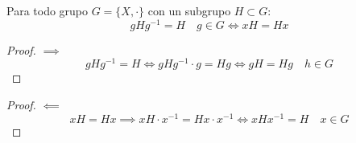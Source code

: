 \begin{thm}
    Para todo grupo $G = \{X, \cdot\}$ con un subgrupo $H \subset G$:
    \begin{equation}
        gHg^{-1} = H \quad g \in G \iff xH = Hx
    \end{equation}

    \begin{proof}
        $\implies$
        \begin{equation}
            gHg^{-1} = H \iff gHg^{-1}\cdot g = Hg \iff gH = Hg \quad h \in G   
        \end{equation}
    \end{proof}

    \begin{proof}
        $\impliedby$
        \begin{equation}
            xH = Hx \implies xH\cdot x^{-1} = Hx\cdot x^{-1} \iff xHx^{-1} = H \quad x \in G     
        \end{equation}
    \end{proof}
\end{thm}
